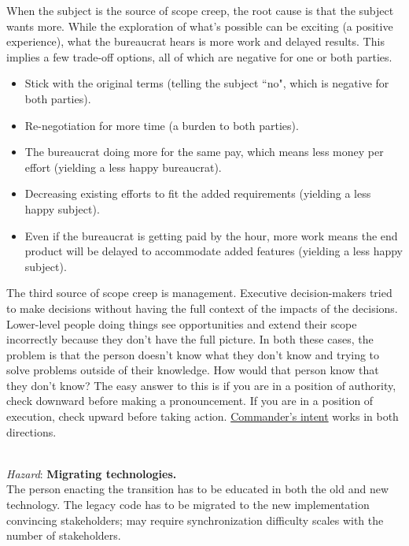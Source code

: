 When the subject is the source of scope creep, the root cause is that the subject wants more. While the exploration of what's possible can be exciting (a positive experience), what the bureaucrat hears is more work and delayed results. This implies a few trade-off options, all of which are negative for one or both parties.
\begin{itemize}
    \item Stick with the original terms (telling the subject ``no", which is negative for both parties).
    \item Re-negotiation for more time (a burden to both parties).
    \item The bureaucrat doing more for the same pay, which means less money per effort (yielding a less happy bureaucrat).
    \item Decreasing existing efforts to fit the added requirements (yielding a less happy subject).
    \item Even if the bureaucrat is getting paid by the hour, more work means the end product will be delayed to accommodate added features (yielding a less happy subject).
\end{itemize}

The third source of scope creep is management. Executive decision-makers tried to make decisions without having the full context of the impacts of the decisions. Lower-level people doing things see opportunities and extend their scope incorrectly because they don't have the full picture. In both these cases, the problem is that the person doesn't know what they don't know and trying to solve problems outside of their knowledge. How would that person know that they don't know? The easy answer to this is if you are in a position of authority, check downward before making a pronouncement. If you are in a position of execution, check upward before taking action. \href{https://en.wikipedia.org/wiki/Intent_(military)\%23Commander's_intent}{Commander's intent}
works in both directions.

\ \\
\textit{Hazard}: \textbf{Migrating technologies.} \\
The person enacting the transition has to be educated in both the old and new technology. 
The legacy code has to be migrated to the new implementation
convincing stakeholders; may require synchronization
difficulty scales with the number of stakeholders.